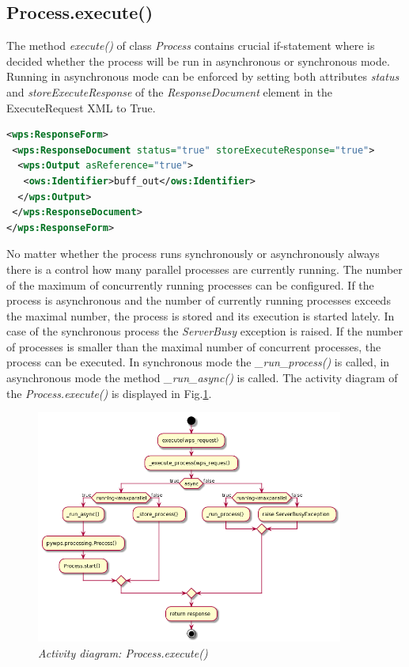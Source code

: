 \documentclass[12pt,a4paper]{article}
\begin{document}
\subsection{Process.execute()}
The method \textit{execute()} of class \textit{Process} contains crucial if-statement where is decided whether the process will be
run in asynchronous or synchronous mode. Running in asynchronous mode can be enforced by setting both attributes \textit{status} and \textit{storeExecuteResponse} of the \textit{ResponseDocument} element in the ExecuteRequest XML to True.

\bigskip
\begin{lstlisting}[basicstyle=\small,caption={ReponseForm element of ExecuteRequest XML},language=XML,label={lst:Execute_ResponseForm}]
<wps:ResponseForm>
 <wps:ResponseDocument status="true" storeExecuteResponse="true">
  <wps:Output asReference="true">
   <ows:Identifier>buff_out</ows:Identifier>
  </wps:Output>
 </wps:ResponseDocument>
</wps:ResponseForm>
\end{lstlisting}
\bigskip 

No matter whether the process runs synchronously or asynchronously always there is a control how many parallel processes are currently
running. The number of the maximum of concurrently running processes can be configured. If the process is asynchronous and the number of currently running processes exceeds the maximal number, the process is stored and its execution is started lately. In case of the synchronous process the \textit{ServerBusy} exception is raised. If the number of processes is smaller than the maximal number of 
concurrent processes, the process can be executed. In synchronous mode the \textit{\_run\_process()} is called, in asynchronous mode the method \textit{\_run\_async()} is called. The activity diagram of the \textit{Process.execute()} is displayed in Fig.\ref{fig:Diag_process_execute}.

\begin{figure}[h!]
\centering
\includegraphics[width=0.9\textwidth]{img/Diag_process_execute.png}
\caption{\textit{Activity diagram: Process.execute()}}
\label{fig:Diag_process_execute}
\end{figure}
\end{document}
